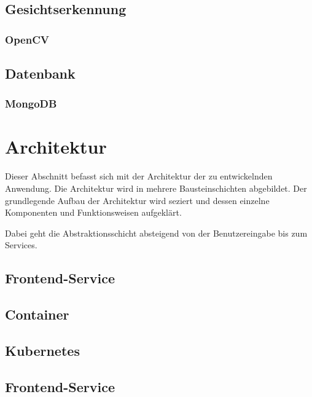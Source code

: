 \subsection{Gesichtserkennung}

\subsubsection{OpenCV}

\subsection{Datenbank}

\subsubsection{MongoDB}

\section{Architektur}
Dieser Abschnitt befasst sich mit der Architektur der zu entwickelnden Anwendung.
Die Architektur wird in mehrere Bausteinschichten abgebildet.
Der grundlegende Aufbau der Architektur wird seziert und dessen einzelne Komponenten
und Funktionsweisen aufgeklärt.

Dabei geht die Abstraktionsschicht absteigend von der Benutzereingabe bis zum Services.






\subsection{Frontend-Service}


\subsection{Container}
\subsection{Kubernetes}
\subsection{Frontend-Service}
